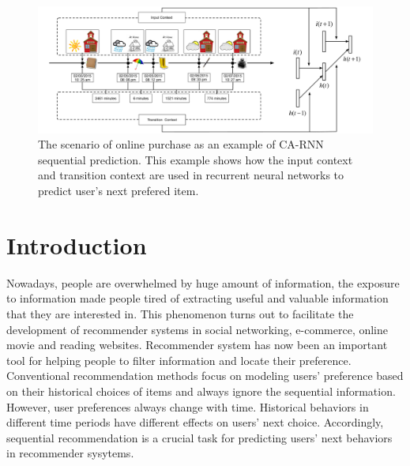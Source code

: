 \documentclass{sig-alternate}
\begin{document}
\begin{figure}[htb]
\centering
\includegraphics[width=1\linewidth]{./introModel.pdf}
\caption{The scenario of online purchase as an example of CA-RNN sequential prediction. This example shows how the input context and transition context are used in recurrent neural networks to predict user's next prefered item.}
\label{fig:Model-intro}
\end{figure}
\section{Introduction}
Nowadays, people are overwhelmed by huge amount of information, the exposure to information made people tired of extracting useful and valuable information that they are interested in. This phenomenon turns out to facilitate the development of recommender systems in social networking, e-commerce, online movie and reading websites. Recommender system has now been an important tool for helping people to filter information and locate their preference. Conventional recommendation methods focus on modeling users' preference based on their historical choices of items and always ignore the sequential information. However, user preferences always change with time. Historical behaviors in different time periods have different effects on users' next choice. Accordingly, sequential recommendation is a crucial task for predicting users' next behaviors in recommender sysytems.
\end{document}
